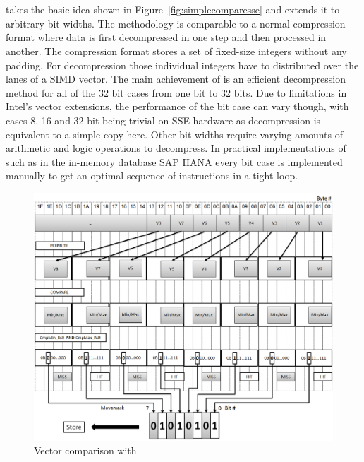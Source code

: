 \section{\simdscan{}}

\simdscan{} \cite{SIMD-Scan} takes the basic idea shown in
Figure~\ref{fig:simplecomparesse} and extends it to arbitrary bit widths. The
methodology is comparable to a normal compression format where data is first
decompressed in one step and then processed in another. The compression format
stores a set of fixed-size integers without any padding. For decompression those
individual integers have to distributed over the lanes of a SIMD vector. The
main achievement of \simdscan{} is an efficient decompression method for all of
the 32 bit cases from one bit to 32 bits. Due to limitations in Intel's vector
extensions, the performance of the bit case can vary though, with cases 8, 16 and
32 bit being trivial on SSE hardware as decompression is equivalent to a simple
copy here. Other bit widths require varying amounts of arithmetic and logic
operations to decompress. In practical implementations of \simdscan{} such as in
the in-memory database SAP HANA every bit case is implemented manually to
get an optimal sequence of instructions in a tight loop.

\vspace{.5cm}

\begin{figure}[h] \begin{center}
\includegraphics[scale=.3]{images/scan.png}
\end{center}
\caption{Vector comparison with \simdscan{}~\cite{AVX2-Scan}}
\label{fig:simdscan}
\end{figure}


